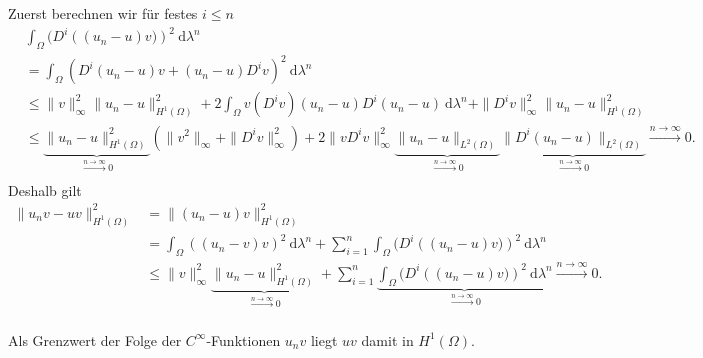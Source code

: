 \begin{solution}
\begin{itemize}
Zuerst berechnen wir für festes $i \leq n$
\begin{align*}
    &\int_\Omega (D^i\left((u_n-u) v)\right)^2 \mathrm{~d}\lambda^n\\
    &= \int_{\Omega} (D^i(u_n-u)v + (u_n-u)D^iv)^2 \mathrm{~d}\lambda^n\\
    &\leq \|v\|^2_\infty \|u_n - u\|^2_{H^1(\Omega)} + 2 \int_{\Omega} v (D^iv) (u_n-u) D^i(u_n - u) \mathrm{~d}\lambda^n + \|D^iv\|^2_\infty \|u_n - u\|^2_{H^1(\Omega)}\\
    &\leq \underbrace{\|u_n - u\|^2_{H^1(\Omega)}}_{\xrightarrow[]{n \rightarrow \infty}{} 0} \left(\|v^2\|_\infty + \|D^iv\|^2_\infty\right) + 2\|vD^iv\|^2_\infty \underbrace{\|u_n-u\|_{L^2(\Omega)}}_{\xrightarrow[]{n \rightarrow \infty}{} 0} \underbrace{\|D^i(u_n-u)\|_{L^2(\Omega)}}_{\xrightarrow[]{n \rightarrow \infty}{} 0} \xrightarrow[]{n \rightarrow \infty}{} 0.
\end{align*}
Deshalb gilt
\begin{align*}
    \| u_n v - uv \|^2_{H^1(\Omega)}
    &= \| (u_n-u) v\|^2_{H^1(\Omega)}\\
    &= \int_\Omega((u_n-v) v)^2 \mathrm{~d}\lambda^n
    + \sum_{i = 1}^n \int_\Omega (D^i\left((u_n-u) v)\right)^2 \mathrm{~d}\lambda^n\\
    &\leq \|v\|^2_\infty \underbrace{\|u_n - u\|^2_{H^1(\Omega)}}_{\xrightarrow[]{n \rightarrow \infty}{} 0} + \sum_{i = 1}^n \underbrace{\int_{\Omega} (D^i\left((u_n-u) v)\right)^2 \mathrm{~d}\lambda^n}_{\xrightarrow[]{n \rightarrow \infty}{} 0} \xrightarrow[]{n \rightarrow \infty}{} 0.
\end{align*}

Als Grenzwert der Folge der $C^\infty$-Funktionen $u_n v$ liegt $uv$ damit in $H^1(\Omega).$
\end{itemize}

\end{solution}

